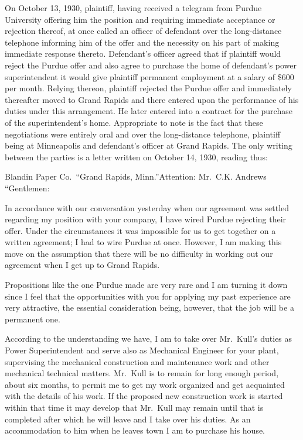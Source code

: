\documentclass[
  letterpaper,
  11pt,
  DIV=9,
  openright]{scrbook}
\renewenvironment{quote}{
  \list{}{\leftmargin=2em\rightmargin=2em}
  \item\relax\small
}
{\endlist}
\begin{document}
On October 13, 1930, plaintiff, having received a telegram from Purdue
University offering him the position and requiring immediate acceptance
or rejection thereof, at once called an officer of defendant over the
long-distance telephone informing him of the offer and the necessity on
his part of making immediate response thereto. Defendant's officer
agreed that if plaintiff would reject the Purdue offer and also agree to
purchase the home of defendant's power superintendent it would give
plaintiff permanent employment at a salary of \$600 per month. Relying
thereon, plaintiff rejected the Purdue offer and immediately thereafter
moved to Grand Rapids and there entered upon the performance of his
duties under this arrangement. He later entered into a contract for the
purchase of the superintendent's home. Appropriate to note is the fact
that these negotiations were entirely oral and over the long-distance
telephone, plaintiff being at Minneapolis and defendant's officer at
Grand Rapids. The only writing between the parties is a letter written
on October 14, 1930, reading thus:

\begin{quote}
Blandin Paper Co.~``Grand Rapids, Minn.''Attention: Mr.~C.K. Andrews
``Gentlemen:
\end{quote}

\begin{quote}
In accordance with our conversation yesterday when our agreement was
settled regarding my position with your company, I have wired Purdue
rejecting their offer. Under the circumstances it was impossible for us
to get together on a written agreement; I had to wire Purdue at once.
However, I am making this move on the assumption that there will be no
difficulty in working out our agreement when I get up to Grand Rapids.
\end{quote}

\begin{quote}
Propositions like the one Purdue made are very rare and I am turning it
down since I feel that the opportunities with you for applying my past
experience are very attractive, the essential consideration being,
however, that the job will be a permanent one.
\end{quote}

\begin{quote}
According to the understanding we have, I am to take over Mr.~Kull's
duties as Power Superintendent and serve also as Mechanical Engineer for
your plant, supervising the mechanical construction and maintenance work
and other mechanical technical matters. Mr.~Kull is to remain for long
enough period, about six months, to permit me to get my work organized
and get acquainted with the details of his work. If the proposed new
construction work is started within that time it may develop that
Mr.~Kull may remain until that is completed after which he will leave
and I take over his duties. As an accommodation to him when he leaves
town I am to purchase his house.
\end{quote}
\end{document}
